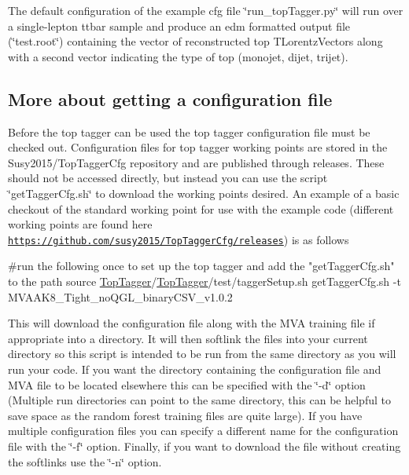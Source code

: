 The default configuration of the example cfg file \char`\"{}run\-\_\-top\-Tagger.\-py\char`\"{} will run over a single-\/lepton ttbar sample and produce an edm formatted output file (\char`\"{}test.\-root\char`\"{}) containing the vector of reconstructed top T\-Lorentz\-Vectors along with a second vector indicating the type of top (monojet, dijet, trijet).

\subsection*{More about getting a configuration file}

Before the top tagger can be used the top tagger configuration file must be checked out. Configuration files for top tagger working points are stored in the Susy2015/\-Top\-Tagger\-Cfg repository and are published through releases. These should not be accessed directly, but instead you can use the script \char`\"{}get\-Tagger\-Cfg.\-sh\char`\"{} to download the working points desired. An example of a basic checkout of the standard working point for use with the example code (different working points are found here \href{https://github.com/susy2015/TopTaggerCfg/releases}{\tt https\-://github.\-com/susy2015/\-Top\-Tagger\-Cfg/releases}) is as follows


\begin{DoxyCode}
\textcolor{preprocessor}{#run the following once to set up the top tagger and add the "getTaggerCfg.sh" to the path}
\textcolor{preprocessor}{}source \hyperlink{classTopTagger}{TopTagger}/\hyperlink{classTopTagger}{TopTagger}/test/taggerSetup.sh
getTaggerCfg.sh -t MVAAK8\_Tight\_noQGL\_binaryCSV\_v1.0.2
\end{DoxyCode}


This will download the configuration file along with the M\-V\-A training file if appropriate into a directory. It will then softlink the files into your current directory so this script is intended to be run from the same directory as you will run your code. If you want the directory containing the configuration file and M\-V\-A file to be located elsewhere this can be specified with the \char`\"{}-\/d\char`\"{} option (Multiple run directories can point to the same directory, this can be helpful to save space as the random forest training files are quite large). If you have multiple configuration files you can specify a different name for the configuration file with the \char`\"{}-\/f\char`\"{} option. Finally, if you want to download the file without creating the softlinks use the \char`\"{}-\/n\char`\"{} option.

